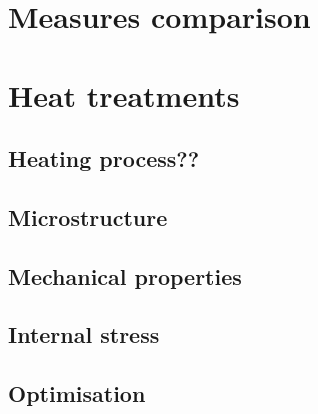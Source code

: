 \section{Measures comparison}

\section{Heat treatments}

\subsection{Heating process??}

\subsection{Microstructure}

\subsection{Mechanical properties}

\subsection{Internal stress}

\subsection{Optimisation}



